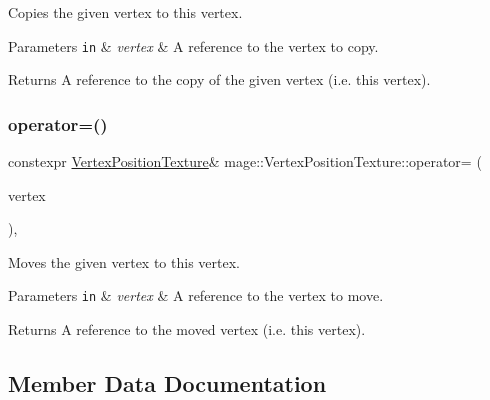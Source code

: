 Copies the given vertex to this vertex.


\begin{DoxyParams}[1]{Parameters}
\mbox{\tt in}  & {\em vertex} & A reference to the vertex to copy. \\
\hline
\end{DoxyParams}
\begin{DoxyReturn}{Returns}
A reference to the copy of the given vertex (i.\+e. this vertex). 
\end{DoxyReturn}
\hypertarget{structmage_1_1_vertex_position_texture_a0f4ffdfe65108d6bac7c2688bcd8f91d}{}\label{structmage_1_1_vertex_position_texture_a0f4ffdfe65108d6bac7c2688bcd8f91d} 
\subsubsection{\texorpdfstring{operator=()}{operator=()}\hspace{0.1cm}{\footnotesize\ttfamily [2/2]}}
{\footnotesize\ttfamily constexpr \hyperlink{structmage_1_1_vertex_position_texture}{Vertex\+Position\+Texture}\& mage\+::\+Vertex\+Position\+Texture\+::operator= (\begin{DoxyParamCaption}\item[{\hyperlink{structmage_1_1_vertex_position_texture}{Vertex\+Position\+Texture} \&\&}]{vertex }\end{DoxyParamCaption})\hspace{0.3cm}{\ttfamily [default]}, {\ttfamily [noexcept]}}

Moves the given vertex to this vertex.


\begin{DoxyParams}[1]{Parameters}
\mbox{\tt in}  & {\em vertex} & A reference to the vertex to move. \\
\hline
\end{DoxyParams}
\begin{DoxyReturn}{Returns}
A reference to the moved vertex (i.\+e. this vertex). 
\end{DoxyReturn}


\subsection{Member Data Documentation}
\hypertarget{structmage_1_1_vertex_position_texture_a49253c4db52d1a4905838ba6ed6c52c6}{}\label{structmage_1_1_vertex_position_texture_a49253c4db52d1a4905838ba6ed6c52c6} 
